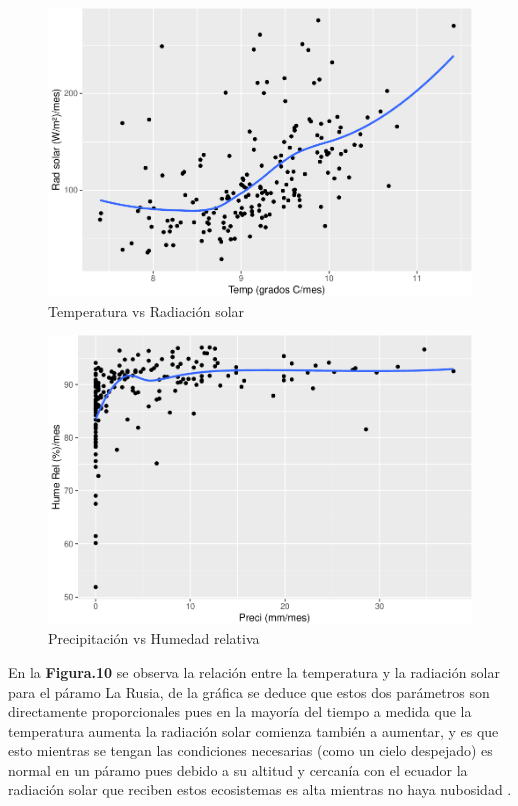 \documentclass[conference,final,]{IEEEtran}
\makeatletter
\def\maxwidth{\ifdim\Gin@nat@width>\linewidth\linewidth
\else\Gin@nat@width\fi}
\let\Oldincludegraphics\includegraphics
\renewcommand{\includegraphics}[1]{\Oldincludegraphics[width=\maxwidth]{#1}}
\makeatother
\begin{document}
\begin{figure}
\centering
\includegraphics{Hidrology_files/figure-latex/unnamed-chunk-20-1.pdf}
\caption{Temperatura vs Radiación solar}
\end{figure}

\begin{figure}
\centering
\includegraphics{Hidrology_files/figure-latex/unnamed-chunk-21-1.pdf}
\caption{Precipitación vs Humedad relativa}
\end{figure}

En la \textbf{Figura.10} se observa la relación entre la temperatura y la
radiación solar para el páramo La Rusia, de la gráfica se deduce que
estos dos parámetros son directamente proporcionales pues en la mayoría
del tiempo a medida que la temperatura aumenta la radiación solar
comienza también a aumentar, y es que esto mientras se tengan las
condiciones necesarias (como un cielo despejado) es normal en un páramo
pues debido a su altitud y cercanía con el ecuador la radiación solar
que reciben estos ecosistemas es alta mientras no haya nubosidad
\citep{montenegro2015estimacion}.
\end{document}
